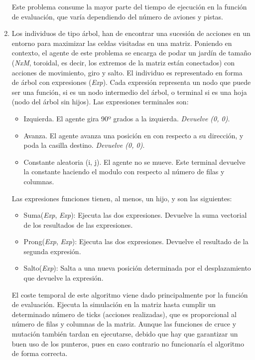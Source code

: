 \begin{enumerate}
		
		Este problema consume la mayor parte del tiempo de ejecución en la función de evaluación, que varía dependiendo del número de aviones y pistas. 
		
		
		
		\item Los individuos de tipo árbol, han de encontrar una sucesión de acciones en un entorno para maximizar las celdas visitadas en una matriz. Poniendo en contexto, el agente de este problema se encarga de podar un jardín de tamaño (\textit{NxM}, toroidal, es decir, los extremos de la matriz están conectados) con acciones de movimiento, giro y salto. El individuo es representado en forma de árbol con expresiones (\textit{Exp}). Cada expresión representa un nodo que puede ser una función, si es un nodo intermedio del árbol, o terminal si es una hoja (nodo del árbol sin hijos). Las expresiones terminales son:
		\begin{itemize}
			\item Izquierda. El agente gira 90º grados a la izquierda. \textit{Devuelve (0, 0)}.
			\item Avanza. El agente avanza una posición en con respecto a su dirección, y poda la casilla destino. \textit{Devuelve (0, 0)}.
			\item Constante aleatoria (i, j). El agente no se mueve. Este terminal devuelve la constante haciendo el modulo con respecto al número de filas y columnas.
		\end{itemize}
		
		Las expresiones funciones tienen, al menos, un hijo, y son las siguientes:
		\begin{itemize}
			\item Suma(\textit{Exp}, \textit{Exp}): Ejecuta las dos expresiones. Devuelve la suma vectorial de los resultados de las expresiones.
			\item Prong(\textit{Exp}, \textit{Exp}): Ejecuta las dos expresiones. Devuelve el resultado de la segunda expresión.
			\item Salto(\textit{Exp}): Salta a una nueva posición determinada por el desplazamiento que devuelve la expresión. 
		\end{itemize}
		
				
		El coste temporal de este algoritmo viene dado principalmente por la función de evaluación. Ejecuta la simulación en la matriz hasta cumplir un determinado número de ticks (acciones realizadas), que es proporcional al número de filas y columnas de la matriz. Aunque las funciones de cruce y mutación también tardan en ejecutarse, debido que hay que garantizar un buen uso de los punteros, pues en caso contrario no funcionaría el algoritmo de forma correcta.
	\end{enumerate}
	

